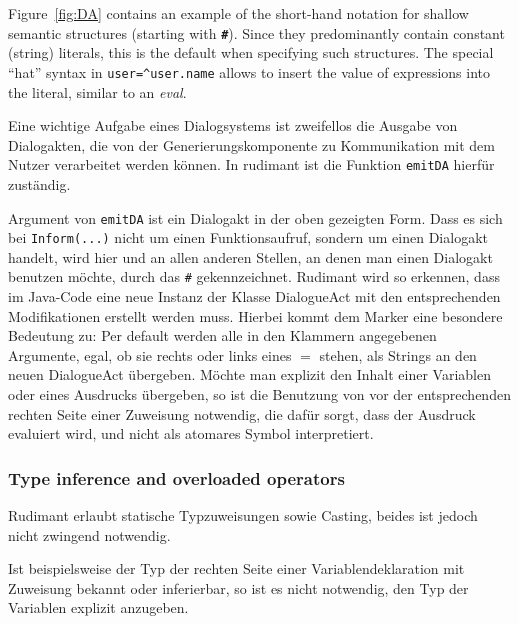 Figure~\ref{fig:DA} contains an example of the short-hand notation
for shallow semantic structures (starting with \textbf{\texttt{\#}}).  Since
they predominantly contain constant (string) literals, this is the default when
specifying such structures. The special ``hat'' syntax in
\texttt{user=\^{}user.name} allows to insert the value of expressions into the
literal, similar to an \emph{eval}.

Eine wichtige Aufgabe eines Dialogsystems ist zweifellos die Ausgabe von
Dialogakten, die von der Generierungskomponente zu Kommunikation mit dem Nutzer
verarbeitet werden können. In rudimant ist die Funktion \texttt{emitDA} hierfür
zuständig.

Argument von \texttt{emitDA} ist ein Dialogakt in der oben gezeigten Form. Dass
es sich bei \texttt{Inform}\verb|(...)| nicht um einen Funktionsaufruf, sondern
um einen Dialogakt handelt, wird hier und an allen anderen Stellen, an denen
man einen Dialogakt benutzen möchte, durch das \verb|#|
gekennzeichnet. Rudimant wird so erkennen, dass im Java-Code eine neue Instanz
der Klasse DialogueAct mit den entsprechenden Modifikationen erstellt werden
muss. Hierbei kommt dem Marker \caret{} eine besondere Bedeutung zu: Per
default werden alle in den Klammern angegebenen Argumente, egal, ob sie rechts
oder links eines $=$ stehen, als Strings an den neuen DialogueAct
übergeben. Möchte man explizit den Inhalt einer Variablen oder eines Ausdrucks
übergeben, so ist die Benutzung von \caret{} vor der entsprechenden rechten
Seite einer Zuweisung notwendig, die dafür sorgt, dass der Ausdruck evaluiert
wird, und nicht als atomares Symbol interpretiert.

\subsubsection{Type inference and overloaded operators}
\label{sec:typeinference}

Rudimant erlaubt statische Typzuweisungen sowie Casting, beides ist jedoch
nicht zwingend notwendig.

Ist beispielsweise der Typ der rechten Seite einer Variablendeklaration mit
Zuweisung bekannt oder inferierbar, so ist es nicht notwendig, den Typ der
Variablen explizit anzugeben.

